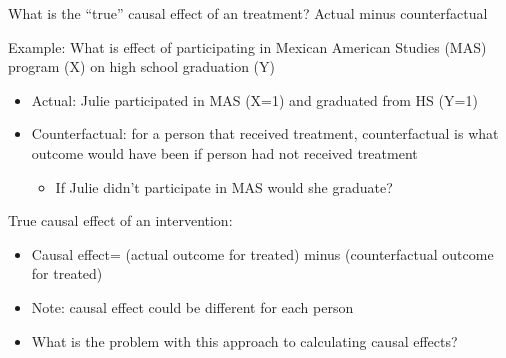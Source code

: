 \begin{frame}{What is the ``true'' causal effect of an treatment? Actual minus counterfactual}

	Example: What is effect of participating in Mexican American Studies (MAS) program (X) on high school graduation (Y)
	\vspace{2mm}	
	\begin{itemize}
		\item Actual: Julie participated in MAS (X=1) and graduated from HS (Y=1)
		\item Counterfactual: for a person that received treatment, counterfactual is what outcome would have been if person had not received treatment
		\begin{itemize}
			\item If Julie didn't participate in MAS would she graduate?
		\end{itemize}

	\end{itemize}
	\vspace{2mm}
	True causal effect of an intervention:
		\begin{itemize}
		\item Causal effect= (actual outcome for treated) minus (counterfactual outcome for treated)
		\item Note: causal effect could be different for each person
		\item What is the problem with this approach to calculating causal effects?
		\end{itemize}

\end{frame}


